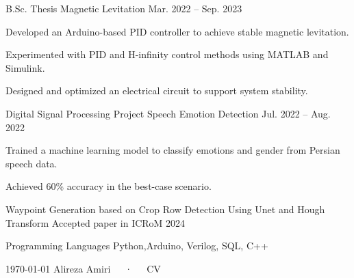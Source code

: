 \documentclass[11pt, a4paper]{awesome-cv}
\begin{document}
\begin{cventries}
	\cventry
	{B.Sc. Thesis}
	{Magnetic Levitation}
	{}
	{Mar. 2022 -- Sep. 2023}
	{
		\begin{cvitems}
			\item {Developed an Arduino-based PID controller to achieve stable magnetic levitation.}
			\item {Experimented with PID and H-infinity control methods using MATLAB and Simulink.}
			\item {Designed and optimized an electrical circuit to support system stability.}
		\end{cvitems}
	}
	\cventry
	{Digital Signal Processing Project}	
	{Speech Emotion Detection}
	{}
	{Jul. 2022 -- Aug. 2022}
	{
		\begin{cvitems}
			\item {Trained a machine learning model to classify emotions and gender from Persian speech data.}
			\item {Achieved 60\% accuracy in the best-case scenario.}
		\end{cvitems}
	}
	
\begin{cvskills}
	\cvskill
	{Waypoint Generation based on Crop Row Detection Using Unet and Hough Transform}
	{Accepted paper in ICRoM 2024}
	\end{cvskills}
	
\begin{cvskills}
\cvskill
{Programming Languages}
{Python,Arduino, Verilog, SQL, C++}
\end{cvskills}	

\begin{cvskills}
\end{cvskills}	
	\makecvfooter
	{\today}
	{Alireza Amiri~~~·~~~CV}
	{\thepage}
\end{cventries}	
\end{document}
